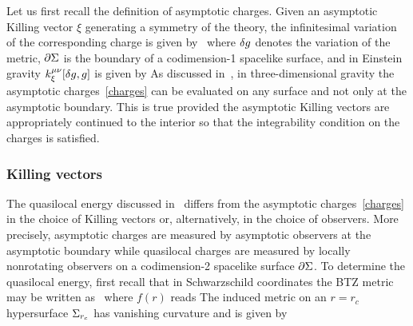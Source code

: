 \documentclass[11pt,a4paper,utf8]{article}
\begin{document}
	Let us first recall the definition of asymptotic charges. Given an asymptotic Killing vector $\xi$ generating a symmetry of the theory, the infinitesimal variation of the corresponding charge is given by~\cite{Barnich:2001jy}
	where $\d g$ denotes the variation of the metric, $\p \ss$ is the boundary of a codimension-1 spacelike surface, and  in Einstein gravity $k_\xi^{\mu\nu} [\d g, g]$ is given by
	As discussed in~\cite{Compere:2015knw}, in three-dimensional gravity the asymptotic charges~\eqref{charges} can be evaluated on any surface and not only at the asymptotic boundary. This is true provided the asymptotic Killing vectors are appropriately continued to the interior so that the integrability condition on the charges is satisfied. 
	
\subsubsection*{Killing vectors}
	
	The quasilocal energy discussed in~\cite{Brown:1994gs} differs from the asymptotic charges~\eqref{charges} in the choice of Killing vectors or, alternatively, in the choice of observers. More precisely, asymptotic charges are measured by asymptotic observers at the asymptotic boundary while quasilocal charges are measured by locally nonrotating observers on a codimension-2 spacelike surface $\p\Sigma$. To determine the quasilocal energy, first recall that in Schwarzschild coordinates the BTZ metric may be written as~\cite{Banados:1992wn}
	where $f(r)$ reads
	The induced metric on an $r = r_c$ hypersurface $\ss_{r_c}$ has vanishing curvature and is given by
	
\end{document}
